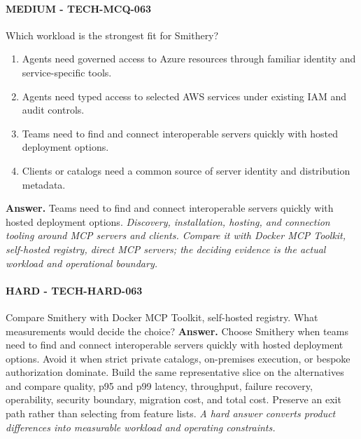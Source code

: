 \paragraph{MEDIUM - TECH-MCQ-063} Which workload is the strongest fit for Smithery?
\begin{enumerate}[label=\Alph*.]
\item Agents need governed access to Azure resources through familiar identity and service-specific tools.
\item Agents need typed access to selected AWS services under existing IAM and audit controls.
\item Teams need to find and connect interoperable servers quickly with hosted deployment options.
\item Clients or catalogs need a common source of server identity and distribution metadata.
\end{enumerate}
\textbf{Answer.} Teams need to find and connect interoperable servers quickly with hosted deployment options.
\textit{Discovery, installation, hosting, and connection tooling around MCP servers and clients. Compare it with Docker MCP Toolkit, self-hosted registry, direct MCP servers; the deciding evidence is the actual workload and operational boundary.}
\paragraph{HARD - TECH-HARD-063} Compare Smithery with Docker MCP Toolkit, self-hosted registry. What measurements would decide the choice?
\textbf{Answer.} Choose Smithery when teams need to find and connect interoperable servers quickly with hosted deployment options. Avoid it when strict private catalogs, on-premises execution, or bespoke authorization dominate. Build the same representative slice on the alternatives and compare quality, p95 and p99 latency, throughput, failure recovery, operability, security boundary, migration cost, and total cost. Preserve an exit path rather than selecting from feature lists.
\textit{A hard answer converts product differences into measurable workload and operating constraints.}
